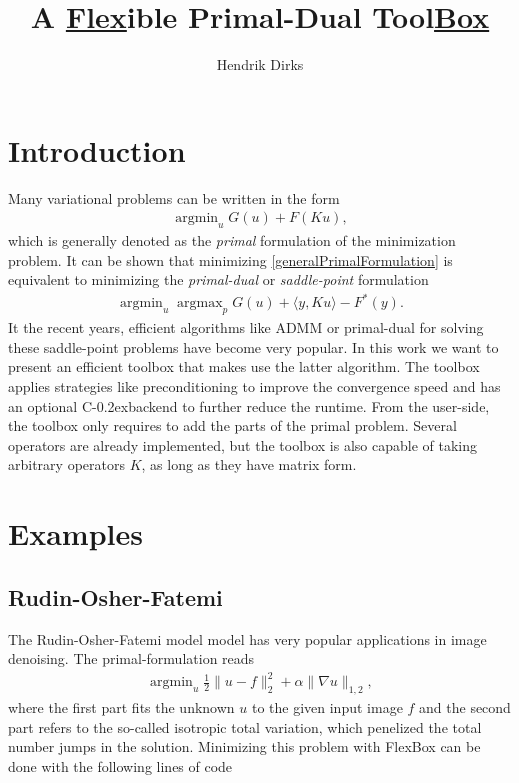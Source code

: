 \documentclass[final,leqno,onefignum,onetabnum]{article}
\title{A \textbf{\underline{Flex}}ible Primal-Dual Tool\textbf{\underline{Box}}}
\author{Hendrik Dirks}
\newcommand{\1}[1]{\mathds{1}_{#1}}
\DeclareMathOperator*{\argmin}{\arg \min}%
\DeclareMathOperator*{\argmax}{\arg \max}%
\newcommand*\cpp{C\kern-0.2ex\raisebox{0.4ex}{\scalebox{0.8}{+\kern-0.4ex+}}}
\begin{document}
	
\maketitle
\section{Introduction}
Many variational problems can be written in the form
\begin{align}
	\argmin_{u} G(u) + F(Ku),
	\label{generalPrimalFormulation}
\end{align}
which is generally denoted as the \textit{primal} formulation of the minimization problem. It can be shown that minimizing \eqref{generalPrimalFormulation} is equivalent to minimizing the \textit{primal-dual} or \textit{saddle-point} formulation
\begin{align}
	\argmin_{u}\argmax_{p} G(u) + \langle y,Ku\rangle - F^*(y).
\label{generalPrimalDualFormulation}
\end{align}
It the recent years, efficient algorithms like ADMM  or primal-dual  for solving these saddle-point problems have become very popular. In this work we want to present an efficient toolbox that makes use the latter algorithm. The toolbox applies strategies like preconditioning to improve the convergence speed and has an optional \cpp backend to further reduce the runtime. From the user-side, the toolbox only requires to add the parts of the primal problem. Several operators are already implemented, but the toolbox is also capable of taking arbitrary operators $K$, as long as they have matrix form.

\section{Examples}

\subsection{Rudin-Osher-Fatemi}
The Rudin-Osher-Fatemi model model has very popular applications in image denoising. The primal-formulation reads
\begin{align}
	\argmin_u \frac{1}{2}\|u-f\|_2^2 + \alpha \|\nabla u\|_{1,2},
\end{align}
where the first part fits the unknown $u$ to the given input image $f$ and the second part refers to the so-called isotropic total variation, which penelized the total number jumps in the solution. Minimizing this problem with FlexBox can be done with the following lines of code
\end{document}
